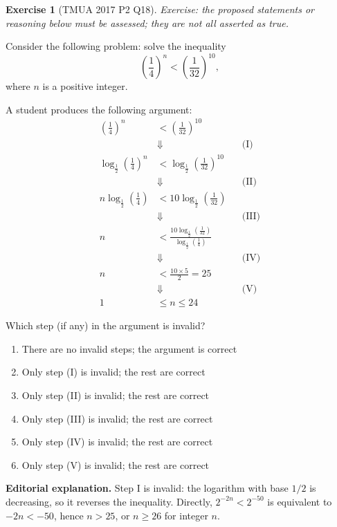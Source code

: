 \documentclass[11pt]{article}
\theoremstyle{definition}
\newtheorem{example}[theorem]{Exercise}
\theoremstyle{remark}
\newcommand{\pqty}[1]{\left(#1\right)}
\begin{document}
\begin{example}[TMUA 2017 P2 Q18]\label{tmua-6-unit-028}
\textit{Exercise: the proposed statements or reasoning below must be assessed; they are not all asserted as true.}\par

    Consider the following problem: solve the inequality
    \[
        \pqty{\frac{1}{4}}^n < \pqty{\frac{1}{32}}^{10},
    \]
    where \(n\) is a positive integer.

    A student produces the following argument:
    \begin{align*}
        \pqty{\frac{1}{4}}^n &< \pqty{\frac{1}{32}}^{10} \\
        &\Downarrow && \text{(I)} \\
        \log_{\frac{1}{2}} \pqty{\frac{1}{4}}^n &< \log_{\frac{1}{2}} \pqty{\frac{1}{32}}^{10} \\
        &\Downarrow && \text{(II)} \\
        n \log_{\frac{1}{2}} \pqty{\frac{1}{4}} &< 10 \log_{\frac{1}{2}} \pqty{\frac{1}{32}} \\
        &\Downarrow && \text{(III)} \\
        n &< \frac{10 \log_{\frac{1}{2}} \pqty{\frac{1}{32}}}{\log_{\frac{1}{2}} \pqty{\frac{1}{4}}} \\
        &\Downarrow && \text{(IV)} \\
        n &< \frac{10 \times 5}{2} = 25 \\
        &\Downarrow && \text{(V)} \\
        1 &\leq n \leq 24
    \end{align*}

    Which step (if any) in the argument is invalid?

    \begin{enumerate}[label=\Alph*.]
        \item There are no invalid steps; the argument is correct
        \item Only step (I) is invalid; the rest are correct
        \item Only step (II) is invalid; the rest are correct
        \item Only step (III) is invalid; the rest are correct
        \item Only step (IV) is invalid; the rest are correct
        \item Only step (V) is invalid; the rest are correct
    \end{enumerate}

\textbf{Editorial explanation.} Step I is invalid: the logarithm with base \(1/2\) is decreasing, so it reverses the inequality. Directly, \(2^{-2n}<2^{-50}\) is equivalent to \(-2n<-50\), hence \(n>25\), or \(n\ge26\) for integer \(n\).
\end{example}
\end{document}
